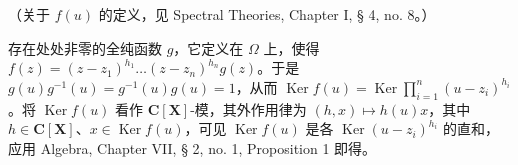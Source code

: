 （关于 \(f(u)\) 的定义，见 Spectral Theories, Chapter I, § 4, no. 8。）

存在处处非零的全纯函数 \(g\)，它定义在 \(\Omega\) 上，使得 \(f(z) = (z - z_1)^{h_1} \ldots (z - z_n)^{h_n} g(z)\)。于是 \(g(u)g^{-1}(u) = g^{-1}(u)g(u) = 1\)，从而 \(\operatorname{Ker}f(u) = \operatorname{Ker}\prod_{i=1}^{n}(u - z_i)^{h_i}\)。将 \(\operatorname{Ker}f(u)\) 看作 \(\mathbf{C}[\mathbf{X}]\)-模，其外作用律为 \((h,x)\mapsto h(u)x\)，其中 \(h\in \mathbf{C}[\mathbf{X}]\)、\(x\in \operatorname{Ker}f(u)\)，可见 \(\operatorname{Ker} f(u)\) 是各 \(\operatorname{Ker}(u - z_i)^{h_i}\) 的直和，应用 Algebra, Chapter VII, § 2, no. 1, Proposition 1 即得。

